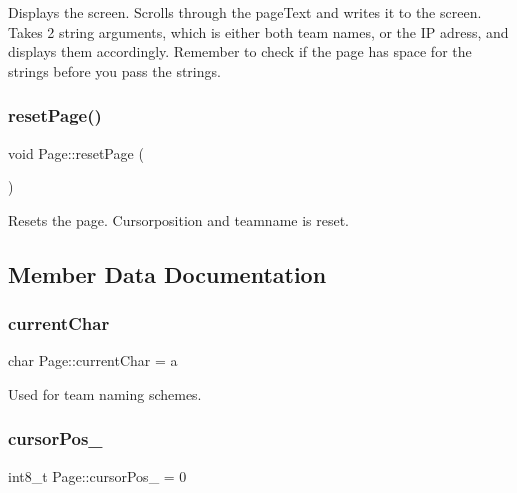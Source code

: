 Displays the screen. Scrolls through the page\+Text and writes it to the screen. Takes 2 string arguments, which is either both team names, or the IP adress, and displays them accordingly. Remember to check if the page has space for the strings before you pass the strings. \mbox{\label{class_page_accc9eda24cc6ccd4133fd8dd59202144}} 
\subsubsection{\texorpdfstring{reset\+Page()}{resetPage()}}
{\footnotesize\ttfamily void Page\+::reset\+Page (\begin{DoxyParamCaption}{ }\end{DoxyParamCaption})\hspace{0.3cm}{\ttfamily [inline]}}



Resets the page. Cursorposition and teamname is reset. 



\subsection{Member Data Documentation}
\mbox{\label{class_page_a807fddcf3944886e052d48fb71888cc9}} 
\subsubsection{\texorpdfstring{current\+Char}{currentChar}}
{\footnotesize\ttfamily char Page\+::current\+Char = \textquotesingle{}a\textquotesingle{}\hspace{0.3cm}{\ttfamily [private]}}



Used for team naming schemes. 

\mbox{\label{class_page_aed4c5e44ec4495ac8f33ae8a55d441e3}} 
\subsubsection{\texorpdfstring{cursor\+Pos\+\_\+}{cursorPos\_}}
{\footnotesize\ttfamily int8\+\_\+t Page\+::cursor\+Pos\+\_\+ = 0\hspace{0.3cm}{\ttfamily [private]}}



